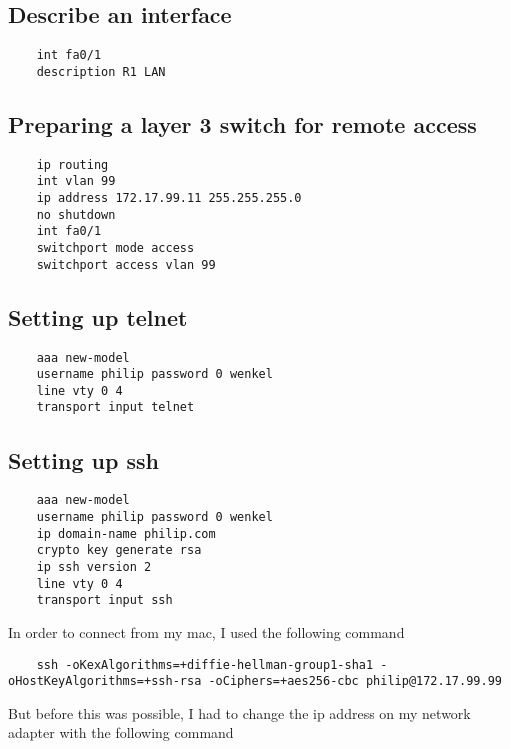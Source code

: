\documentclass{article}
\begin{document}
\subsection{Describe an interface}
\begin{verbatim}
	int fa0/1
	description R1 LAN
\end{verbatim}

\subsection{Preparing a layer 3 switch for remote access}

\begin{verbatim}
	ip routing
	int vlan 99
	ip address 172.17.99.11 255.255.255.0
	no shutdown
	int fa0/1
	switchport mode access
	switchport access vlan 99
\end{verbatim}

\subsection{Setting up telnet}
\begin{verbatim}
	aaa new-model
	username philip password 0 wenkel
	line vty 0 4
	transport input telnet
\end{verbatim}

\subsection{Setting up ssh}
\begin{verbatim}
	aaa new-model
	username philip password 0 wenkel
	ip domain-name philip.com
	crypto key generate rsa
	ip ssh version 2
	line vty 0 4
	transport input ssh
\end{verbatim}

In order to connect from my mac, I used the following command 

\begin{verbatim}
	ssh -oKexAlgorithms=+diffie-hellman-group1-sha1 -oHostKeyAlgorithms=+ssh-rsa -oCiphers=+aes256-cbc philip@172.17.99.99
\end{verbatim}

But before this was possible, I had to change the ip address on my network adapter with the following command
\end{document}
